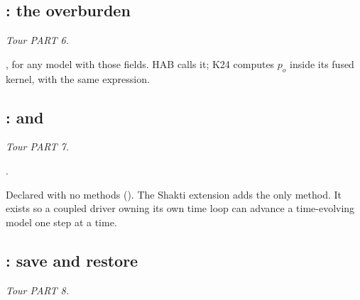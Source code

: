 \subsection{: the overburden}\label{ref:commonep}
\emph{Tour PART 6.}
\begin{fnlist}
\item[update\_Po!(model, grid, state)] , for any model with those fields. HAB calls
  it; K24 computes $p_o$ inside its fused kernel, with the same expression.
\end{fnlist}

\subsection{:  and }\label{ref:run}
\emph{Tour PART 7.}
\begin{fnlist}
\item[run!(sim::SteadyStateSimulation)] .
\item[step!] Declared with no methods (). The Shakti extension adds the only method. It exists so a coupled
  driver owning its own time loop can advance a time-evolving model one step at a time.
\end{fnlist}

\subsection{: save and restore}\label{ref:checkpoint}
\emph{Tour PART 8.}

